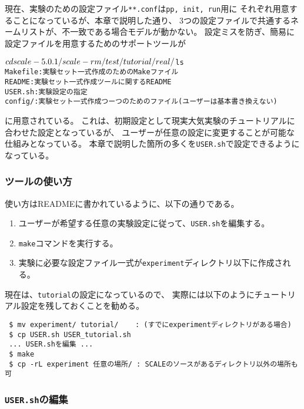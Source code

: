 \section{\SecMakeconfTool} \label{sec:basic_makeconf}

現在、実験のための設定ファイル\verb|**.conf|は\verb|pp, init, run|用に
それぞれ用意することになっているが、本章で説明した通り、
3つの設定ファイルで共通するネームリストが、不一致である場合モデルが動かない。
設定ミスを防ぎ、簡易に設定ファイルを用意するためのサポートツールが
\begin{alltt}
 $ cd scale-{\version}/scale-rm/test/tutorial/real/
 $ ls 
    Makefile : 実験セット一式作成のためのMakeファイル
    README   : 実験セット一式作成ツールに関するREADME
    USER.sh  : 実験設定の指定
    config/  : 実験セット一式作成つーつのためのファイル(ユーザーは基本書き換えない)
\end{alltt}
に用意されている。
これは、初期設定として現実大気実験のチュートリアルに合わせた設定となっているが、
ユーザーが任意の設定に変更することが可能な仕組みとなっている。
本章で説明した箇所の多くを\verb|USER.sh|で設定できるようになっている。


\subsubsection{ツールの使い方}

使い方はREADMEに書かれているように、以下の通りである。
\begin{enumerate}
  \item ユーザーが希望する任意の実験設定に従って、\verb|USER.sh|を編集する。
  \item \verb|make|コマンドを実行する。
  \item 実験に必要な設定ファイル一式が\verb|experiment|ディレクトリ以下に作成される。
\end{enumerate}

現在は、\verb|tutorial|の設定になっているので、
実際には以下のようにチュートリアル設定を残しておくことを勧める。
\begin{verbatim}
 $ mv experiment/ tutorial/    : (すでにexperimentディレクトリがある場合)
 $ cp USER.sh USER_tutorial.sh
 ... USER.shを編集 ...
 $ make
 $ cp -rL experiment 任意の場所/ : SCALEのソースがあるディレクトリ以外の場所も可
\end{verbatim}


\subsubsection{\texttt{USER.sh}の編集}

